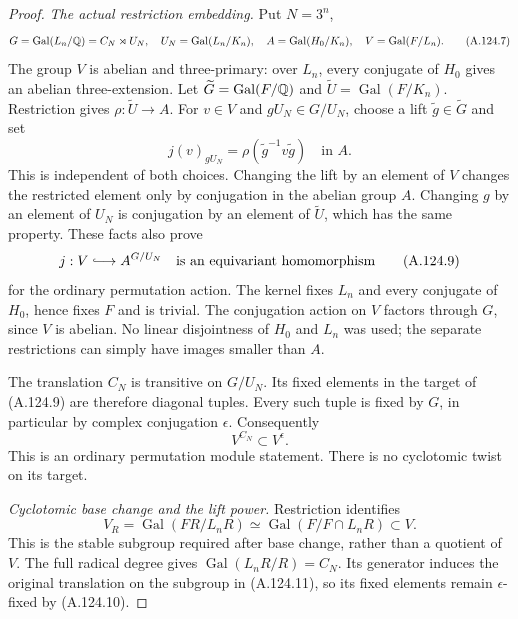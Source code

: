 \begin{proof}
\emph{The actual restriction embedding.}
Put \(N=3^n\),
\[
 G=\operatorname{Gal}(L_n/\mathbb Q)=C_N\rtimes U_N,\quad
 U_N=\operatorname{Gal}(L_n/K_n),\quad
 A=\operatorname{Gal}(H_0/K_n),\quad
 V=\operatorname{Gal}(F/L_n).
 \tag{A.124.7}
\]
The group \(V\) is abelian and three-primary:
over \(L_n\), every conjugate of \(H_0\) gives
an abelian three-extension.
Let \(\widetilde G=\operatorname{Gal}(F/\mathbb Q)\)
and \(\widetilde U=\operatorname{Gal}(F/K_n)\).
Restriction gives
\(\rho:\widetilde U\to A\).
For \(v\in V\) and \(gU_N\in G/U_N\), choose a
lift \(\widetilde g\in\widetilde G\) and set
\[
  j(v)_{gU_N}
           =\rho(\widetilde g^{-1}v\widetilde g)
          \quad\text{in }A.
 \tag{A.124.8}
\]
This is independent of both choices.
Changing the lift by an element of \(V\) changes
the restricted element only by conjugation in
the abelian group \(A\).
Changing \(g\) by an element of \(U_N\) is
conjugation by an element of \(\widetilde U\),
which has the same property.
These facts also prove
\[
               j:V\lhook\joinrel\longrightarrow A^{G/U_N}
       \quad\text{is an equivariant homomorphism}
 \tag{A.124.9}
\]
for the ordinary permutation action.
The kernel fixes \(L_n\) and every conjugate of
\(H_0\), hence fixes \(F\) and is trivial.
The conjugation action on \(V\) factors through
\(G\), since \(V\) is abelian.
No linear disjointness of \(H_0\) and \(L_n\)
was used; the separate restrictions can simply
have images smaller than \(A\).

The translation \(C_N\) is transitive on \(G/U_N\).
Its fixed elements in the target of (A.124.9)
are therefore diagonal tuples.
Every such tuple is fixed by \(G\), in particular
by complex conjugation \(\epsilon\).
Consequently
\[
                             V^{C_N}\subset V^{\epsilon}.
 \tag{A.124.10}
\]
This is an ordinary permutation module statement.
There is no cyclotomic twist on its target.

\emph{Cyclotomic base change and the lift power.}
Restriction identifies
\[
 V_R=\operatorname{Gal}(FR/L_nR)
        \simeq\operatorname{Gal}(F/F\cap L_nR)
                          \subset V .
 \tag{A.124.11}
\]
This is the stable subgroup required after base
change, rather than a quotient of \(V\).
The full radical degree gives
\(\operatorname{Gal}(L_nR/R)=C_N\).
Its generator induces the original translation
on the subgroup in (A.124.11), so its fixed
elements remain \(\epsilon\)-fixed by (A.124.10).


\end{proof}
